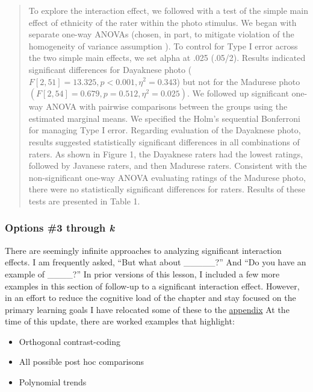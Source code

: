 \documentclass[
  11pt,
]{book}
\providecommand{\tightlist}{%
  \setlength{\itemsep}{0pt}\setlength{\parskip}{0pt}}
\begin{document}
\begin{quote}
To explore the interaction effect, we followed with a test of the simple main effect of ethnicity of the rater within the photo stimulus. We began with separate one-way ANOVAs (chosen, in part, to mitigate violation of the homogeneity of variance assumption \citep{kassambara_anova_nodate}). To control for Type I error across the two simple main effects, we set alpha at .025 (.05/2). Results indicated significant differences for Dayaknese photo (\(F [2, 51] = 13.325, p < 0.001, \eta ^{2} = 0.343\)) but not for the Madurese photo \((F [2, 54] = 0.679, p = 0.512, \eta ^{2} = 0.025)\). We followed up significant one-way ANOVA with pairwise comparisons between the groups using the estimated marginal means. We specified the Holm's sequential Bonferroni for managing Type I error. Regarding evaluation of the Dayaknese photo, results suggested statistically significant differences in all combinations of raters. As shown in Figure 1, the Dayaknese raters had the lowest ratings, followed by Javanese raters, and then Madurese raters. Consistent with the non-significant one-way ANOVA evaluating ratings of the Madurese photo, there were no statistically significant differences for raters. Results of these tests are presented in Table 1.
\end{quote}

\hypertarget{options-3-through-k}{%
\subsubsection{\texorpdfstring{Options \#3 through \emph{k}}{Options \#3 through k}}\label{options-3-through-k}}

There are seemingly infinite approaches to analyzing significant interaction effects. I am frequently asked, ``But what about \_\_\_\_\_?'' And ``Do you have an example of \_\_\_\_?'' In prior versions of this lesson, I included a few more examples in this section of follow-up to a significant interaction effect. However, in an effort to reduce the cognitive load of the chapter and stay focused on the primary learning goals I have relocated some of these to the \protect\hyperlink{moRe}{appendix} At the time of this update, there are worked examples that highlight:

\begin{itemize}
\tightlist
\item
  Orthogonal contrast-coding
\item
  All possible post hoc comparisons
\item
  Polynomial trends
\end{itemize}
\end{document}
